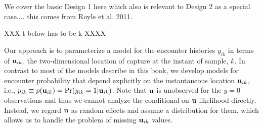 We cover the basic Design 1 here which also is relevant to Design 2 as
a special case.... this comes from Royle et al. 2011. 

XXX t below has to be k XXXX

Our approach is to parameterize a model for the encounter histories
$y_{ik}$ in terms of ${\bf u}_{ik}$, the two-dimensional location of
capture at the instant of sample, $k$. In contrast to most of the models describe in this book, we
develop
 models for encounter probability that depend
explicitly on the instantaneous location ${\bf u}_{ik}$, i.e., $p_{ik} \equiv p({\bf u}_{ik}) =
\Pr(y_{ik}=1|{\bf u}_{ik})$.  Note that ${\bf u}$ is unobserved for
the $y=0$ observations and thus we cannot analyze the
conditional-on-${\bf u}$ likelihood directly. Instead, we regard ${\bf
  u}$ as random effects and assume a distribution for them, which
allows us to handle the problem of missing ${\bf u}_{ik}$ values.

